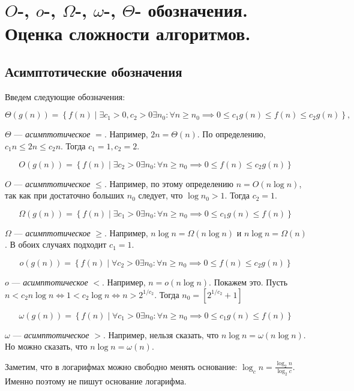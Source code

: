 \section{$O$-, $o$-, $\Omega$-, $\omega$-, $\Theta$- обозначения. Оценка сложности алгоритмов.}
\subsection{Асимптотические обозначения}

Введем следующие обозначения:

\[
  \Theta(g(n)) = \left\{ f(n)\mid \exists c_1>0, c_2>0 \exists n_0: \forall n 
  \geqslant n_0 \implies 0\leqslant c_1g(n)\leqslant f(n) \leqslant c_2g(n) \right\},
\]

$\Theta$ --- \emph{асимптотическое} $\mathcal{=}$. Например, $2n = \Theta(n)$. 
По определению, $c_1n \leqslant 2n \leqslant c_2n$. Тогда $c_1 = 1, c_2 = 2$.

\[
  O(g(n)) = \left\{ f(n)\mid \exists  c_2>0 \exists n_0: \forall n \geqslant n_0
  \implies 0\leqslant f(n) \leqslant c_2g(n) \right\}
\]

$O$ --- \emph{асимптотическое} $\leqslant$. Например, по этому определению 
$n = O(n \log{n})$, так как при достаточно больших $n_0$ следует, что
$\log n_0 > 1$. Тогда $c_2 = 1$.

\[
\Omega(g(n)) = \left\{ f(n)\mid \exists c_1>0 \exists n_0: \forall n \geqslant
 n_0 \implies 0\leqslant c_1g(n)\leqslant f(n) \right\}
\]

$\Omega$ --- \emph{асимптотическое} $\geqslant$. Например, $n \log n = \Omega(n 
\log n)$ и $n \log n = \Omega(n)$. В обоих случаях подходит $c_1 = 1$.

\[
  o(g(n)) = \left\{ f(n)\mid \forall  c_2>0 \exists n_0: \forall n \geqslant n_0
  \implies 0\leqslant f(n) \leqslant c_2g(n) \right\}
 \]

$o$ --- \emph{асимптотическое} $<$. Например, $n = o(n \log n)$. Покажем это. 
Пусть $n < c_2 n \log n \iff 1 < c_2 \log n \iff n > 2^{1/c_2}$. Тогда $n_0 = [2^{1/c_2} + 1]$

\[
  \omega(g(n)) = \left\{ f(n)\mid \forall c_1>0 \exists n_0: \forall n \geqslant
  n_0 \implies 0\leqslant c_1g(n)\leqslant f(n) \right\}
\]

$\omega$ --- \emph{асимптотическое} $>$. Например, нельзя сказать, что $n \log n
 = \omega(n \log n)$. Но можно сказать, что  $n \log n = \omega(n)$.

Заметим, что в логарифмах можно свободно менять основание: $\log_c n = \frac 
{\log_2 n}{\log_2 c}$. Именно поэтому не пишут основание логарифма.
